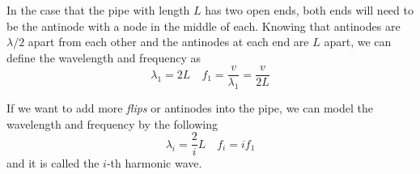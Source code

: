 
In the case that the pipe with length $L$ has two open ends, both ends will need to be the antinode
with a node in the middle of each. Knowing that antinodes are $\lambda/2$ apart from each other and 
the antinodes at each end are $L$ apart, we can define the wavelength and frequency as
\[ \lambda_1 = 2L\quad f_1 = \frac{v}{\lambda_1} = \frac{v}{2L} \]

If we want to add more \textit{flips} or antinodes into the pipe, we can model the wavelength and
frequency by the following \[ \lambda_i = \frac{2}{i}L \quad f_i = i f_1 \]
and it is called the $i$-th harmonic wave.

